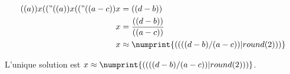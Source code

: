 \exercice*

\begin{align*}
  (( a )) x (( "%
  (( a )) x (( "%
  (( a - c )) x &= (( d - b )) \\
  x &= \frac{(( d - b ))}{(( a - c ))} \\
  x &\approx \numprint{(( ((d-b)/(a-c)) | round(2) ))}
\end{align*}

L'unique solution est $x\approx\numprint{(( ((d-b)/(a-c)) | round(2) ))}$.
